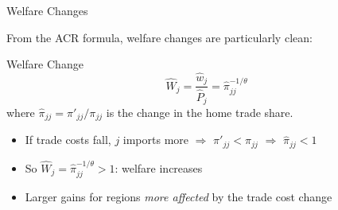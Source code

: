 \documentclass{beamer}
\begin{document}
\begin{frame}{Welfare Changes}

    From the ACR formula, welfare changes are particularly clean:

    \vspace{0.3em}
    \begin{block}{Welfare Change}
        \vspace{-0.5em}
        \[ \hat{W}_j = \frac{\hat{w}_j}{\hat{P}_j} = \hat{\pi}_{jj}^{-1/\theta} \]
        where $\hat{\pi}_{jj} = \pi'_{jj}/\pi_{jj}$ is the change in the home trade share.
    \end{block}

    \vspace{0.5em}
    \begin{itemize}
        \item If trade costs fall, $j$ imports more $\Rightarrow$ $\pi'_{jj} < \pi_{jj}$ $\Rightarrow$ $\hat{\pi}_{jj} < 1$
        \item So $\hat{W}_j = \hat{\pi}_{jj}^{-1/\theta} > 1$: welfare increases
        \item Larger gains for regions \emph{more affected} by the trade cost change
    \end{itemize}

    \vspace{0.3em}

\end{frame}
\end{document}

